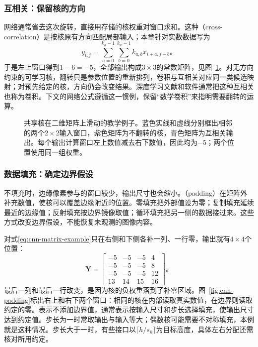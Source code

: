 \subsubsection{互相关：保留核的方向}
\label{sec:cnn-correlation-operation}

网络通常省去这次旋转，直接用存储的核权重对窗口求和。这种（cross-correlation）是按核原有方向匹配局部输入；本章针对实数数据写为
\begin{equation}
  y_{i,j}=\sum_{a=0}^{k_h-1}\sum_{b=0}^{k_w-1}
    k_{a,b}x_{i+a,j+b}\text{。}
  \label{eq:cnn-cross-correlation}
\end{equation}
于是左上窗口得到$1-6=-5$，全部输出构成$3\times3$的常数矩阵，见图~\ref{fig:cnn-sliding-window}。对无方向约束的可学习核，翻转只是参数位置的重新排列，卷积与互相关对应同一类候选映射；对预先给定的核，方向仍会改变结果。深度学习文献和软件通常把这种互相关也称为卷积。下文的网络公式遵循这一惯例，保留“数学卷积”来指明需要翻转的运算。

\begin{figure}[htb]
  \centering
  
  \caption{共享核在二维矩阵上滑动的教学例子。蓝色实线和虚线分别框出相邻的两个$2\times2$输入窗口，紫色矩阵为不翻转的核，青色矩阵为互相关输出。每个输出计算窗口左上数值减去右下数值，因此均为$-5$；两个位置使用同一组权重。}
  \label{fig:cnn-sliding-window}
\end{figure}

\subsubsection{数据填充：确定边界假设}
\label{sec:cnn-padding-operation}

不填充时，边缘像素参与的窗口较少，输出尺寸也会缩小。（padding）在矩阵外补充数值，使核可以覆盖边缘附近的位置。零填充把外部值设为零；复制填充延续最近的边缘值；反射填充按边界镜像取值；循环填充把另一侧的数据接过来。这些方式改变边界假设，不能恢复未观测的图像内容。

对式\eqref{eq:cnn-matrix-example}只在右侧和下侧各补一列、一行零，输出就有$4\times4$个位置：
\begin{equation}
  \bm Y=\begin{bmatrix}
    -5&-5&-5&4\\-5&-5&-5&8\\-5&-5&-5&12\\13&14&15&16
  \end{bmatrix}\text{。}
  \label{eq:cnn-padding-example}
\end{equation}
最后一列和最后一行改变，是因为核的负权重落到了补零区域。图~\ref{fig:cnn-padding}标出右上和右下两个窗口：相同的核在内部读取真实数值，在边界则读取约定的零。表示不添加边界值，通常表示按输入尺寸和步长选择填充，使输出尺寸达到约定值。步长为一时常取输出与输入等大；偶数核可能需要不对称填充，本例就是这种情况。步长大于一时，有些接口以$\lceil h/s_h\rceil$为目标高度，具体左右分配还需核对所用约定。



